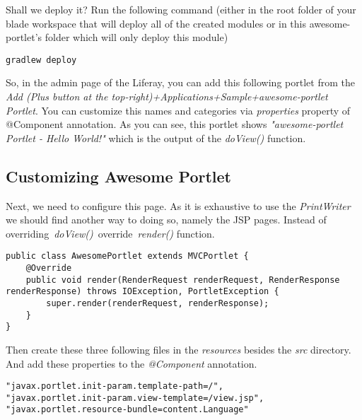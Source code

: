 Shall we deploy it? Run the following command (either in the root folder of your blade workspace that will deploy all of the created modules or in this awesome-portlet's folder which will only deploy this module)

\lstset{language=bash}
\begin{lstlisting}
gradlew deploy
\end{lstlisting}

So, in the admin page of the Liferay, you can add this following portlet from the \textit{Add (Plus button at the top-right)+Applications+Sample+awesome-portlet Portlet}. You can customize this names and categories via \textit{properties} property of @Component annotation.
As you can see, this portlet shows \textit{"awesome-portlet Portlet - Hello World!"} which is the output of the \textit{doView()} function.

\subsection{Customizing Awesome Portlet}
Next, we need to configure this page. As it is exhaustive to use the \textit{PrintWriter} we should find another way to doing so, namely the JSP pages. Instead of overriding \textit{doView()} override \textit{render()} function.

\lstset{language=java}
\begin{minipage}{\linewidth}
\begin{lstlisting}[caption=AwesomePortlet.java]
public class AwesomePortlet extends MVCPortlet {
    @Override
    public void render(RenderRequest renderRequest, RenderResponse renderResponse) throws IOException, PortletException {
        super.render(renderRequest, renderResponse);
    }
}
\end{lstlisting}
\end{minipage}

Then create these three following files in the \textit{resources} besides the \textit{src} directory. And add these properties to the \textit{@Component} annotation.

\lstset{language=java}
\begin{minipage}{\linewidth}
\begin{lstlisting}[caption=AwesomePortlet.java]
"javax.portlet.init-param.template-path=/",
"javax.portlet.init-param.view-template=/view.jsp",
"javax.portlet.resource-bundle=content.Language"
\end{lstlisting}
\end{minipage}

